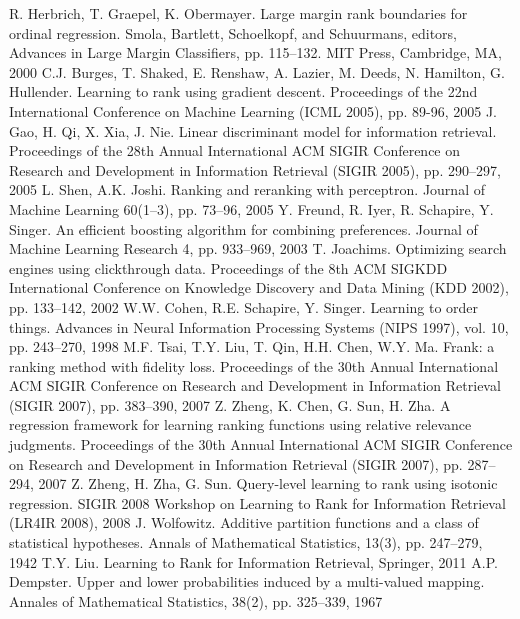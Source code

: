 \documentclass[12pt,a4paper,oneside]{article}
\begin{document}
\begin{thebibliography}{9}
	 R. Herbrich, T. Graepel, K. Obermayer. Large margin rank boundaries for ordinal regression. Smola, Bartlett, Schoelkopf, and Schuurmans, editors, Advances in Large Margin Classifiers, pp. 115–132. MIT Press, Cambridge, MA, 2000%
	 C.J. Burges, T. Shaked, E. Renshaw, A. Lazier, M. Deeds, N. Hamilton, G. Hullender. Learning to rank using gradient descent. Proceedings of the 22nd International Conference on Machine Learning (ICML 2005), pp. 89-96, 2005%
	 J. Gao, H. Qi, X. Xia, J. Nie. Linear discriminant model for information retrieval. Proceedings of the 28th Annual International ACM SIGIR Conference on Research and Development in Information Retrieval (SIGIR 2005), pp. 290–297, 2005%
	 L. Shen, A.K. Joshi. Ranking and reranking with perceptron. Journal of Machine Learning 60(1–3), pp. 73–96, 2005%
	 Y. Freund, R. Iyer, R. Schapire, Y. Singer. An efficient boosting algorithm for combining preferences. Journal of Machine Learning Research 4, pp. 933–969, 2003%
	 T. Joachims. Optimizing search engines using clickthrough data. Proceedings of the 8th ACM SIGKDD International Conference on Knowledge Discovery and Data Mining (KDD 2002), pp. 133–142, 2002%
	 W.W. Cohen, R.E. Schapire, Y. Singer. Learning to order things. Advances in Neural Information Processing Systems (NIPS 1997), vol. 10, pp. 243–270, 1998%
	 M.F. Tsai, T.Y. Liu, T. Qin, H.H. Chen, W.Y. Ma. Frank: a ranking method with fidelity loss. Proceedings of the 30th Annual International ACM SIGIR Conference on Research and Development in Information Retrieval (SIGIR 2007), pp. 383–390, 2007%
	 Z. Zheng, K. Chen, G. Sun, H. Zha. A regression framework for learning ranking functions using relative relevance judgments. Proceedings of the 30th Annual International ACM SIGIR Conference on Research and Development in Information Retrieval (SIGIR 2007), pp. 287–294, 2007%
	 Z. Zheng, H. Zha, G. Sun. Query-level learning to rank using isotonic regression. SIGIR 2008 Workshop on Learning to Rank for Information Retrieval (LR4IR 2008), 2008%
	 J. Wolfowitz. Additive partition functions and a class of statistical hypotheses. Annals of Mathematical Statistics, 13(3), pp. 247–279, 1942%
	 T.Y. Liu. Learning to Rank for Information Retrieval, Springer, 2011%
	 A.P. Dempster. Upper and lower probabilities induced by a multi-valued mapping. Annales of Mathematical Statistics, 38(2), pp. 325–339, 1967%

\end{thebibliography}
\end{document}
